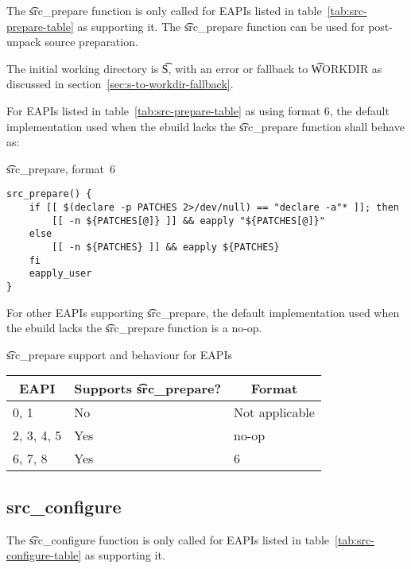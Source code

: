  The \t{src_prepare} function is only called for EAPIs listed in
table~\ref{tab:src-prepare-table} as supporting it. The \t{src_prepare} function can be used for
post-unpack source preparation.

The initial working directory is \t{S}, with an error or fallback to \t{WORKDIR} as discussed in
section~\ref{sec:s-to-workdir-fallback}.

 For EAPIs listed in table~\ref{tab:src-prepare-table} as using format
6, the default implementation used when the ebuild lacks the \t{src_prepare} function shall behave
as:

\begin{listing}[H]
\caption{\t{src_prepare}, format~6}
\begin{verbatim}
src_prepare() {
    if [[ $(declare -p PATCHES 2>/dev/null) == "declare -a"* ]]; then
        [[ -n ${PATCHES[@]} ]] && eapply "${PATCHES[@]}"
    else
        [[ -n ${PATCHES} ]] && eapply ${PATCHES}
    fi
    eapply_user
}
\end{verbatim}
\end{listing}

For other EAPIs supporting \t{src_prepare}, the default implementation used when the ebuild lacks
the \t{src_prepare} function is a no-op.

\begin{centertable}{\t{src_prepare} support and behaviour for EAPIs}
    \label{tab:src-prepare-table}
    \begin{tabular}{lll}
      \toprule
      \multicolumn{1}{c}{\textbf{EAPI}} &
      \multicolumn{1}{c}{\textbf{Supports \t{src_prepare}?}} &
      \multicolumn{1}{c}{\textbf{Format}} \\
      \midrule
      0, 1              & No  & Not applicable \\
      2, 3, 4, 5        & Yes & no-op          \\
      6, 7, 8           & Yes & 6              \\
      \bottomrule
    \end{tabular}
\end{centertable}

\subsection{src_configure}

 The \t{src_configure} function is only called for EAPIs listed in
table~\ref{tab:src-configure-table} as supporting it.

